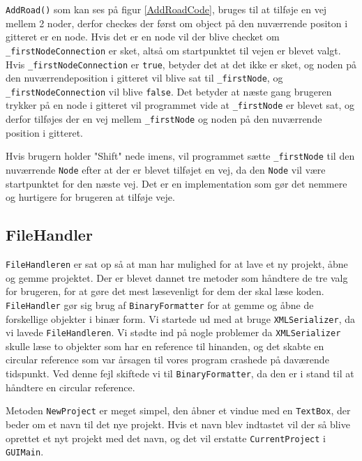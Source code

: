 \texttt{AddRoad()} som kan ses på figur \ref{AddRoadCode}, bruges til at tilføje en vej mellem 2 noder, derfor checkes der først om object på den nuværrende positon i gitteret er en node. Hvis det er en node vil der blive checket om \texttt{\_firstNodeConnection} er sket, altså om startpunktet til vejen er blevet valgt. Hvis \texttt{\_firstNodeConnection} er \texttt{true}, betyder det at det ikke er sket, og noden på den nuværrendeposition i gitteret vil blive sat til \texttt{\_firstNode}, og \texttt{\_firstNodeConnection} vil blive \texttt{false}. Det betyder at næste gang brugeren trykker på en node i gitteret vil programmet vide at \texttt{\_firstNode} er blevet sat, og derfor tilføjes der en vej mellem \texttt{\_firstNode} og noden på den nuværrende position i gitteret.

\vspace{5mm}

Hvis brugern holder "Shift" nede imens, vil programmet sætte \texttt{\_firstNode} til den nuværrende \texttt{Node} efter at der er blevet tilføjet en vej, da den \texttt{Node} vil være startpunktet for den næste vej. Det er en implementation som gør det nemmere og hurtigere for brugeren at tilføje veje. 

\subsection{FileHandler}
\texttt{FileHandleren} er sat op så at man har mulighed for at lave et ny projekt, åbne og gemme projektet. Der er blevet dannet tre metoder som håndtere de tre valg for brugeren, for at gøre det mest læsevenligt for dem der skal læse koden. \texttt{FileHandler} gør sig brug af \texttt{BinaryFormatter} for at gemme og åbne de forskellige objekter i binær form. Vi startede ud med at bruge \texttt{XMLSerializer}, da vi lavede \texttt{FileHandleren}. Vi stødte ind på nogle problemer da \texttt{XMLSerializer} skulle læse to objekter som har en reference til hinanden, og det skabte en circular reference som var årsagen til vores program crashede på daværende tidspunkt. Ved denne fejl skiftede vi til \texttt{BinaryFormatter}, da den er i stand til at håndtere en circular reference.

\vspace{5mm}

Metoden \texttt{NewProject} er meget simpel, den åbner et vindue med en \texttt{TextBox}, der beder om et navn til det nye projekt. Hvis et navn blev indtastet vil der så blive oprettet et nyt projekt med det navn, og det vil erstatte \texttt{CurrentProject} i \texttt{GUIMain}.

